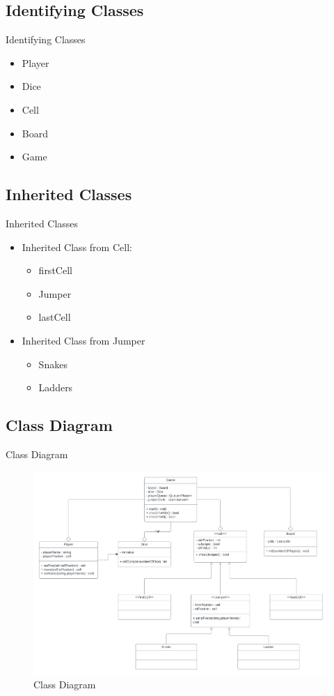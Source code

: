 \documentclass{beamer}
\begin{document}
\subsection{Identifying Classes}
\begin{frame}{Identifying Classes}
    \begin{itemize}
        \item Player
        \item Dice
        \item Cell
        \item Board
        \item Game
    \end{itemize}
\end{frame}
\subsection{Inherited Classes}
\begin{frame}{Inherited Classes}
    \begin{itemize}
        \item Inherited Class from Cell:
        \begin{itemize}
            \item firstCell
            \item Jumper
            \item lastCell
        \end{itemize}
        \item Inherited Class from Jumper
        \begin{itemize}
            \item Snakes
            \item Ladders
        \end{itemize}
    \end{itemize}
\end{frame}
\subsection{Class Diagram}
\begin{frame}{Class Diagram}
    \begin{figure}
        \centering
        \includegraphics[width = 0.9\linewidth]{images/Class Diagram.png}
        \caption{Class Diagram}
        \label{fig:enter-label}
    \end{figure}
\end{frame}
\end{document}
